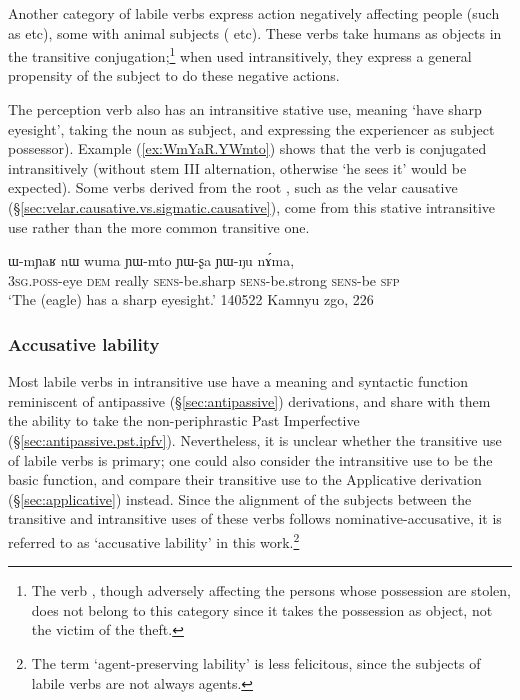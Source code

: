 Another category of labile verbs express action negatively affecting people (such as  etc), some with animal subjects ( etc).  These verbs take humans as objects in the transitive conjugation;\footnote{The verb , though adversely affecting the persons whose possession are stolen, does not belong to this category since it takes the possession as object, not the victim of the theft.} when used intransitively, they express a general propensity of the subject to do these negative actions.


The perception verb  also has an intransitive stative use, meaning `have sharp eyesight', taking the noun  as subject, and expressing the experiencer as subject possessor). Example (\ref{ex:WmYaR.YWmto}) shows that the verb  is conjugated intransitively (without stem III alternation, otherwise  `he sees it' would be expected). Some verbs derived from the root , such as the velar causative  (§\ref{sec:velar.causative.vs.sigmatic.causative}), come from this stative intransitive use rather than the more common transitive one.

\begin{exe}
\ex \label{ex:WmYaR.YWmto}
\gll ɯ-mɲaʁ nɯ wuma ɲɯ-mto ɲɯ-ʂa ɲɯ-ŋu nɤ́ma, \\
\textsc{3sg}.\textsc{poss}-eye \textsc{dem} really \textsc{sens}-be.sharp \textsc{sens}-be.strong \textsc{sens}-be \textsc{sfp} \\
\glt `The (eagle) has a sharp eyesight.' 140522 Kamnyu zgo, 226
\end{exe}


\subsubsection{Accusative lability} \label{sec:lability.apass}
Most labile verbs in intransitive use have a meaning and syntactic function reminiscent of antipassive (§\ref{sec:antipassive}) derivations, and share with them the ability to take the non-periphrastic Past Imperfective  (§\ref{sec:antipassive.pst.ipfv}). Nevertheless, it is unclear whether  the transitive use of labile verbs is primary; one could also consider the intransitive use to be the basic function, and compare their transitive use to the Applicative derivation (§\ref{sec:applicative}) instead. Since the alignment of the subjects between the transitive and intransitive uses of these verbs follows nominative-accusative, it is referred to as `accusative lability' in this work.\footnote{The term `agent-preserving lability' is less felicitous, since the subjects of labile verbs are not always agents.}
 
